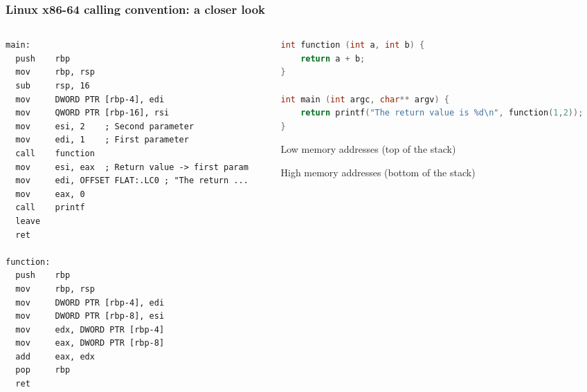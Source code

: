 \documentclass[]{beamer}
\begin{document}
\begin{frame}[fragile]
  \frametitle{Linux x86-64 calling convention: a closer look}
  \begin{columns}
    \begin{column}{.5\textwidth}
\begin{lstlisting}[language={[x86masm]Assembler},basicstyle=\tiny\ttfamily]
main:
  push    rbp
  mov     rbp, rsp
  sub     rsp, 16
  mov     DWORD PTR [rbp-4], edi
  mov     QWORD PTR [rbp-16], rsi
  mov     esi, 2    ; Second parameter
  mov     edi, 1    ; First parameter
  call    function
  mov     esi, eax  ; Return value -> first param
  mov     edi, OFFSET FLAT:.LC0 ; "The return ...
  mov     eax, 0
  call    printf
  leave
  ret

function:
  push    rbp
  mov     rbp, rsp
  mov     DWORD PTR [rbp-4], edi
  mov     DWORD PTR [rbp-8], esi
  mov     edx, DWORD PTR [rbp-4]
  mov     eax, DWORD PTR [rbp-8]
  add     eax, edx
  pop     rbp
  ret
\end{lstlisting}
    \end{column}

    \begin{column}{.5\textwidth}

\begin{lstlisting}[language=C,basicstyle=\tiny\ttfamily]
int function (int a, int b) {
    return a + b;
}

int main (int argc, char** argv) {
    return printf("The return value is %d\n", function(1,2));
}
\end{lstlisting}

      \begin{center}
        {\tiny Low memory addresses (top of the stack)}
        \begin{center}
        \end{center}
        {\tiny High memory addresses (bottom of the stack)}
      \end{center}
    \end{column}
  \end{columns}
  \begin{figure}
  \end{figure}
\end{frame}
\end{document}
